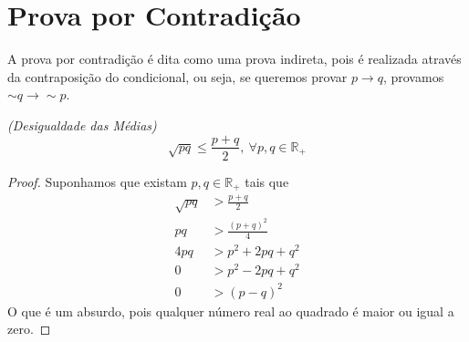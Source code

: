 \section{Prova por Contradição}
A prova por contradição é dita como uma prova indireta, pois é realizada através da contraposição do condicional, ou seja, se queremos provar $p \rightarrow q$, provamos $\sim \! q \rightarrow \sim \! p$. \par 
\begin{exemplo} \emph{(Desigualdade das Médias)}
\[\sqrt{pq} \le \frac{p+q}{2},\ \forall p,q \in \mathbb{R}_{+}\]
\begin{proof}
Suponhamos que existam $p,q \in \mathbb{R}_+$ tais que
\begin{align*}
\sqrt{pq} &> \frac{p+q}{2} \\
pq &> \frac{(p+q)^2}{4} \\
4pq &> p^2 +2pq +q^2 \\
0 &> p^2 -2pq + q^2 \\
0 &> {(p-q)}^2
\end{align*}
O que é um absurdo, pois qualquer número real ao quadrado é maior ou igual a zero.
\end{proof}
\end{exemplo}

